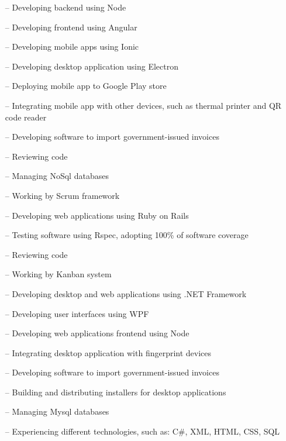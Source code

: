 
\begin{itemize}
  \setlength{\itemindent}{1em}
\item[--] {Developing backend using Node}
\item[--] {Developing frontend using Angular}
\item[--] {Developing mobile apps using Ionic}
\item[--] {Developing desktop application using Electron}
\item[--] {Deploying mobile app to Google Play store}
\item[--] {Integrating mobile app with other devices, such as thermal printer and QR code reader}
\item[--] {Developing software to import government-issued invoices}
\item[--] {Reviewing code}
\item[--] {Managing NoSql databases}
\item[--] {Working by Scrum framework}
\end{itemize}

\pagebreak


\begin{itemize}
  \setlength{\itemindent}{1em}
\item[--] {Developing web applications using Ruby on Rails}
\item[--] {Testing software using Rspec, adopting 100\% of software coverage}
\item[--] {Reviewing code}
\item[--] {Working by Kanban system}
\end{itemize}

\cveventseparator


\begin{itemize}
  \setlength{\itemindent}{1em}
\item[--] {Developing desktop and web applications using .NET Framework}
\item[--] {Developing user interfaces using WPF}
\item[--] {Developing web applications frontend using Node}
\item[--] {Integrating desktop application with fingerprint devices}
\item[--] {Developing software to import government-issued invoices}
\item[--] {Building and distributing installers for desktop applications}
\item[--] {Managing Mysql databases}
\item[--] {Experiencing different technologies, such as: C\#, XML, HTML, CSS, SQL}
\end{itemize}
